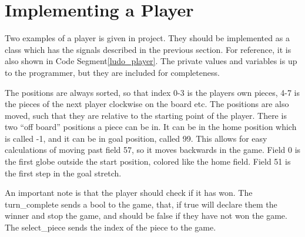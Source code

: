 \documentclass[a4paper,10pt]{article}
\renewcommand\lstlistingname{Code Segment}
\begin{document}
\section{Implementing a Player}
Two examples of a player is given in project.
They should be implemented as a class which has the signals described in the previous section.
For reference, it is also shown in \lstlistingname \ref{ludo_player}.
The private values and variables is up to the programmer, but they are included for completeness.

The positions are always sorted, so that index 0-3 is the players own pieces, 4-7 is the pieces of the next player clockwise on the board etc.
The positions are also moved, such that they are relative to the starting point of the player.
There is two ``off board'' positions a piece can be in.
It can be in the home position which is called -1, and it can be in goal position, called 99.
This allows for easy calculations of moving past field 57, so it moves backwards in the game.
Field 0 is the first globe outside the start position, colored like the home field.
Field 51 is the first step in the goal stretch.

An important note is that the player should check if it has won.
The turn\_complete sends a bool to the game, that, if true will declare them the winner and stop the game, and should be false if they have not won the game.
The select\_piece sends the index of the piece to the game.


\end{document}
